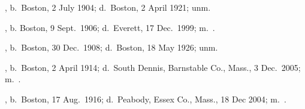 \begin{Kids}
	, b.\ Boston, 2 July 1904;\cite{Caroline5McGurinBirth} d.\ Boston, 2 April 1921; unm.\cite{Caroline5McGurinDeath}
	
	, b. Boston, 9 Sept.\ 1906;\cite{Catherine5McGurinBirth} d.\ Everett, 17 Dec.\ 1999;\cite{Catherine5McGurinDeath} m.\ .\cite{Catherine5McGurinDeath}
	
	, b.\ Boston, 30 Dec.\ 1908;\cite{Josephine5McGurinBirth} d.\ Boston, 18 May 1926; unm.\cite{Josephine5McGurinDeath}
	
	, b.\ Boston, 2 April 1914;\cite{John5McGurinBirth} d.\ South Dennis, Barnstable Co., Mass., 3 Dec.\ 2005;\cite{John5McGurinDeath} m.\ .\cite{John5McGurinDeath}
	
	, b.\ Boston, 17 Aug.\ 1916;\cite{Charles5McGurinBirth} d.\ Peabody, Essex Co., Mass., 18 Dec 2004;\cite{Charles5McGurinDeath} m.\ .\cite{Charles5McGurinDeath}
\end{Kids}